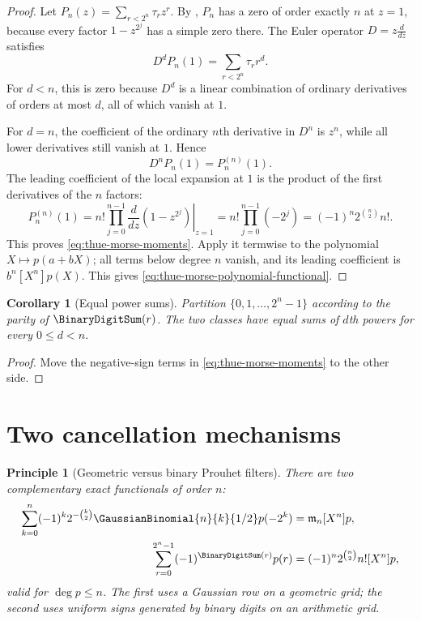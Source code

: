 \documentclass[11pt,a4paper,oneside,openany]{book}
\newtheorem{corollary}[corollary]{Corollary}
\newtheorem{principle}[principle]{Principle}
\theoremstyle{definition}
\theoremstyle{remark}
\begin{document}
\begin{proof}
Let
$P_n(z)=\sum_{r<2^n}\tau_rz^r$.  By , $P_n$ has a zero of order exactly $n$ at $z=1$, because every factor $1-z^{2^j}$ has a simple zero there.  The Euler operator $D=z\frac{d}{dz}$ satisfies
\[
 D^dP_n(1)=\sum_{r<2^n}\tau_rr^d.
\]
For $d<n$, this is zero because $D^d$ is a linear combination of ordinary derivatives of orders at most $d$, all of which vanish at $1$.

For $d=n$, the coefficient of the ordinary $n$th derivative in $D^n$ is $z^n$, while all lower derivatives still vanish at $1$.  Hence
\[
 D^nP_n(1)=P_n^{(n)}(1).
\]
The leading coefficient of the local expansion at $1$ is the product of the first derivatives of the $n$ factors:
\[
 P_n^{(n)}(1)
 =n!\prod_{j=0}^{n-1}\left.\frac{d}{dz}(1-z^{2^j})\right|_{z=1}
 =n!\prod_{j=0}^{n-1}(-2^j)
 =(-1)^n2^{\binom n2}n!.
\]
This proves \eqref{eq:thue-morse-moments}.  Apply it termwise to the polynomial $X\mapsto p(a+bX)$; all terms below degree $n$ vanish, and its leading coefficient is $b^n[X^n]p(X)$.  This gives \eqref{eq:thue-morse-polynomial-functional}.
\end{proof}

\begin{corollary}[Equal power sums]\label{cor:thue-morse-prouhet-partition}
Partition $\{0,1,\ldots,2^n-1\}$ according to the parity of $\BinaryDigitSum(r)$.  The two classes have equal sums of $d$th powers for every $0\le d<n$.
\end{corollary}

\begin{proof}
Move the negative-sign terms in \eqref{eq:thue-morse-moments} to the other side.
\end{proof}

\section{Two cancellation mechanisms}

\begin{principle}[Geometric versus binary Prouhet filters]\label{prin:two-prouhet-filters}
There are two complementary exact functionals of order $n$:
\begin{align*}
 \sum_{k=0}^{n}(-1)^k2^{-\binom k2}\GaussianBinomial{n}{k}{1/2}p(-2^k)
 &=\mathfrak m_n[X^n]p,\\
 \sum_{r=0}^{2^n-1}(-1)^{\BinaryDigitSum(r)}p(r)
 &=(-1)^n2^{\binom n2}n![X^n]p,
\end{align*}
valid for $\deg p\le n$.  The first uses a Gaussian row on a geometric grid; the second uses uniform signs generated by binary digits on an arithmetic grid.
\end{principle}
\end{document}
